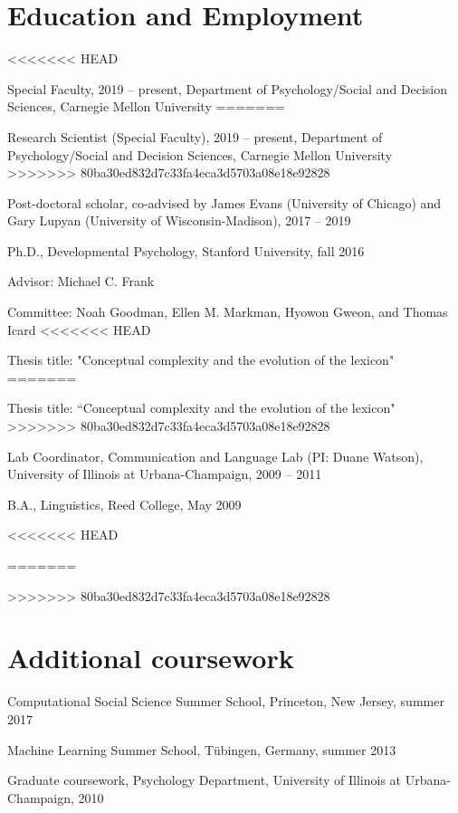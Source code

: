 \documentclass[letterpaper]{article}
\renewenvironment{itemize}{
  \begin{list}{}{
    \setlength{\leftmargin}{1.5em}
  }
}{
  \end{list}
}
\begin{document}
\section*{Education and Employment}
\begin{itemize}

<<<<<<< HEAD
\item Special Faculty, 2019 -- present, Department of Psychology/Social and Decision Sciences, Carnegie Mellon University
=======
\item Research Scientist (Special Faculty), 2019 -- present, Department of Psychology/Social and Decision Sciences, Carnegie Mellon University
>>>>>>> 80ba30ed832d7c33fa4eca3d5703a08e18e92828

\item Post-doctoral scholar, co-advised by James Evans (University of Chicago) and Gary Lupyan (University of Wisconsin-Madison), 2017 -- 2019


  \item Ph.D., Developmental Psychology, Stanford University, fall 2016
  \begin{itemize}
  	\item Advisor: Michael C. Frank
  		\item Committee: Noah Goodman, Ellen M. Markman, Hyowon Gweon, and Thomas Icard
<<<<<<< HEAD
  	\item Thesis title: "Conceptual complexity and the evolution of the lexicon"
=======
  	\item Thesis title: ``Conceptual complexity and the evolution of the lexicon"
>>>>>>> 80ba30ed832d7c33fa4eca3d5703a08e18e92828

   \end{itemize}
   \item Lab Coordinator, Communication and Language Lab (PI: Duane Watson), University of Illinois at Urbana-Champaign,  2009 -- 2011
  \item  B.A., Linguistics, Reed College, May 2009
  \end{itemize}
<<<<<<< HEAD
  
=======

>>>>>>> 80ba30ed832d7c33fa4eca3d5703a08e18e92828
  \section*{Additional coursework}
  \begin{itemize}
     \item Computational Social Science Summer School, Princeton, New Jersey, summer 2017
   \item Machine Learning Summer School, T\"{u}bingen, Germany, summer 2013
   \item Graduate coursework, Psychology Department, University of Illinois at Urbana-Champaign, 2010
\end{itemize}
\end{document}
